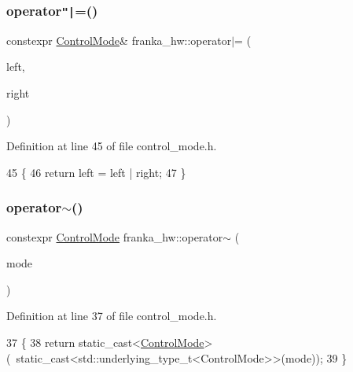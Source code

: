 \subsubsection{\texorpdfstring{operator\texttt{"|}=()}{operator|=()}}
{\footnotesize\ttfamily constexpr \hyperlink{namespacefranka__hw_afa416558ce4baace5ac6c71bd5d2c98c}{Control\+Mode}\& franka\+\_\+hw\+::operator$\vert$= (\begin{DoxyParamCaption}\item[{\hyperlink{namespacefranka__hw_afa416558ce4baace5ac6c71bd5d2c98c}{Control\+Mode} \&}]{left,  }\item[{\hyperlink{namespacefranka__hw_afa416558ce4baace5ac6c71bd5d2c98c}{Control\+Mode}}]{right }\end{DoxyParamCaption})}



Definition at line 45 of file control\+\_\+mode.\+h.


\begin{DoxyCode}
45                                                                         \{
46   \textcolor{keywordflow}{return} left = left | right;
47 \}
\end{DoxyCode}
\mbox{\label{namespacefranka__hw_afb4d4bc5509c24838d523b6f8d90b58a}} 
\subsubsection{\texorpdfstring{operator$\sim$()}{operator~()}}
{\footnotesize\ttfamily constexpr \hyperlink{namespacefranka__hw_afa416558ce4baace5ac6c71bd5d2c98c}{Control\+Mode} franka\+\_\+hw\+::operator$\sim$ (\begin{DoxyParamCaption}\item[{\hyperlink{namespacefranka__hw_afa416558ce4baace5ac6c71bd5d2c98c}{Control\+Mode}}]{mode }\end{DoxyParamCaption})}



Definition at line 37 of file control\+\_\+mode.\+h.


\begin{DoxyCode}
37                                                   \{
38   \textcolor{keywordflow}{return} \textcolor{keyword}{static\_cast<}\hyperlink{namespacefranka__hw_afa416558ce4baace5ac6c71bd5d2c98c}{ControlMode}\textcolor{keyword}{>}(~static\_cast<std::underlying\_type\_t<ControlMode>>(mode));
39 \}
\end{DoxyCode}
